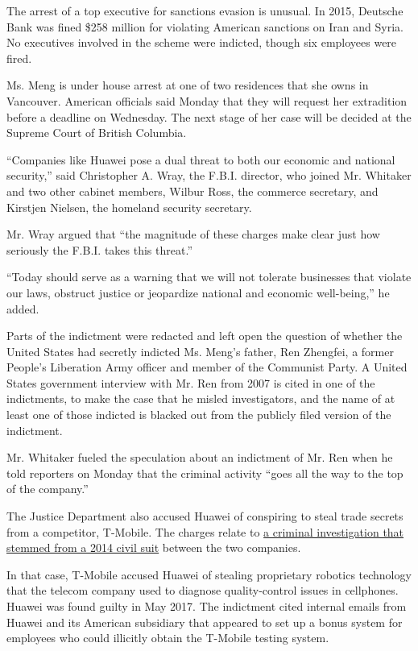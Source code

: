 The arrest of a top executive for sanctions evasion is unusual. In 2015,
Deutsche Bank was fined \$258 million for violating American sanctions
on Iran and Syria. No executives involved in the scheme were indicted,
though six employees were fired.

Ms. Meng is under house arrest at one of two residences that she owns in
Vancouver. American officials said Monday that they will request her
extradition before a deadline on Wednesday. The next stage of her case
will be decided at the Supreme Court of British Columbia.

``Companies like Huawei pose a dual threat to both our economic and
national security,'' said Christopher A. Wray, the F.B.I. director, who
joined Mr. Whitaker and two other cabinet members, Wilbur Ross, the
commerce secretary, and Kirstjen Nielsen, the homeland security
secretary.

Mr. Wray argued that ``the magnitude of these charges make clear just
how seriously the F.B.I. takes this threat.''

``Today should serve as a warning that we will not tolerate businesses
that violate our laws, obstruct justice or jeopardize national and
economic well-being,'' he added.

Parts of the indictment were redacted and left open the question of
whether the United States had secretly indicted Ms. Meng's father, Ren
Zhengfei, a former People's Liberation Army officer and member of the
Communist Party. A United States government interview with Mr. Ren from
2007 is cited in one of the indictments, to make the case that he misled
investigators, and the name of at least one of those indicted is blacked
out from the publicly filed version of the indictment.

Mr. Whitaker fueled the speculation about an indictment of Mr. Ren when
he told reporters on Monday that the criminal activity ``goes all the
way to the top of the company.''

The Justice Department also accused Huawei of conspiring to steal trade
secrets from a competitor, T-Mobile. The charges relate to
\href{https://www.nytimes.com/2019/01/16/technology/huawei-investigation-trade-secrets.html}{a
criminal investigation that stemmed from a 2014 civil suit} between the
two companies.

In that case, T-Mobile accused Huawei of stealing proprietary robotics
technology that the telecom company used to diagnose quality-control
issues in cellphones. Huawei was found guilty in May 2017. The
indictment cited internal emails from Huawei and its American subsidiary
that appeared to set up a bonus system for employees who could illicitly
obtain the T-Mobile testing system.

